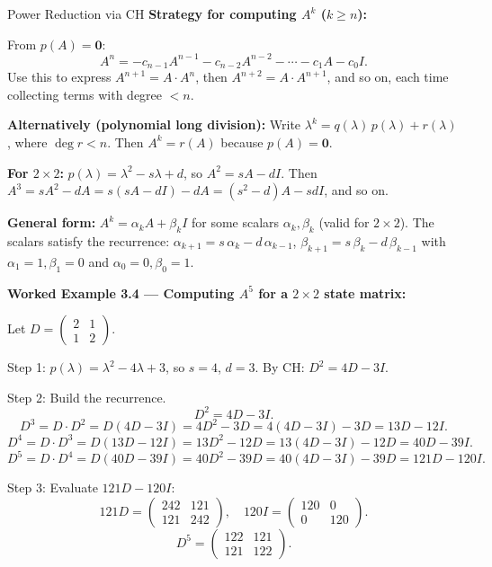 \documentclass[12pt,a4paper]{article}
\begin{document}
\begin{infobox}{Power Reduction via CH}
\textbf{Strategy for computing $A^{k}$ ($k \geq n$):}

From $p(A) = \mathbf{0}$:
\[
  A^{n} = -c_{n-1}A^{n-1} - c_{n-2}A^{n-2} - \cdots - c_{1}A - c_{0}I.
\]
Use this to express $A^{n+1} = A \cdot A^{n}$, then $A^{n+2} = A \cdot A^{n+1}$, and so on,
each time collecting terms with degree $< n$.

\textbf{Alternatively (polynomial long division):}
Write $\lambda^{k} = q(\lambda)\,p(\lambda) + r(\lambda)$,
where $\deg r < n$.
Then $A^{k} = r(A)$ because $p(A) = \mathbf{0}$.

\textbf{For $2\times2$:} $p(\lambda)=\lambda^{2}-s\lambda+d$, so
$A^{2} = sA - dI$.
Then $A^{3} = sA^{2}-dA = s(sA-dI)-dA = (s^{2}-d)A - sdI$, and so on.

\textbf{General form:}
$A^{k} = \alpha_{k}A + \beta_{k}I$ for some scalars $\alpha_{k},\beta_{k}$
(valid for $2\times2$).
The scalars satisfy the recurrence:
$\alpha_{k+1} = s\,\alpha_{k} - d\,\alpha_{k-1}$,
$\beta_{k+1} = s\,\beta_{k} - d\,\beta_{k-1}$
with $\alpha_{1}=1,\beta_{1}=0$ and $\alpha_{0}=0,\beta_{0}=1$.
\end{infobox}

\textbf{Worked Example 3.4 --- Computing $A^{5}$ for a $2\times2$ state matrix:}

Let $D = \begin{pmatrix} 2 & 1 \\ 1 & 2 \end{pmatrix}$.

Step 1: $p(\lambda) = \lambda^{2} - 4\lambda + 3$, so $s=4$, $d=3$.
By CH: $D^{2} = 4D - 3I$.

Step 2: Build the recurrence.
\[
  D^{2} = 4D - 3I.
\]
\[
  D^{3} = D \cdot D^{2} = D(4D-3I) = 4D^{2}-3D = 4(4D-3I)-3D = 13D - 12I.
\]
\[
  D^{4} = D \cdot D^{3} = D(13D-12I) = 13D^{2}-12D = 13(4D-3I)-12D = 40D - 39I.
\]
\[
  D^{5} = D \cdot D^{4} = D(40D-39I) = 40D^{2}-39D = 40(4D-3I)-39D = 121D - 120I.
\]

Step 3: Evaluate $121D - 120I$:
\[
  121D = \begin{pmatrix}242&121\\121&242\end{pmatrix}, \quad
  120I = \begin{pmatrix}120&0\\0&120\end{pmatrix}.
\]
\[
  D^{5} = \begin{pmatrix}122&121\\121&122\end{pmatrix}.
\]
\end{document}
